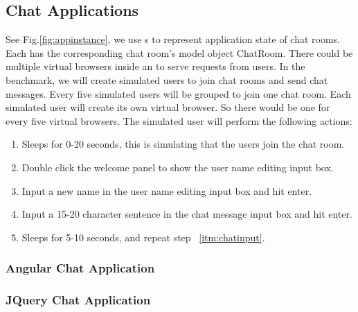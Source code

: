 \clickthroughput{}
\clicklatency{}

\clickwaitthroughput{}
\clickwaitlatency{}

\subsection{Chat Applications}
See Fig.\ref{fig:appinstance},
we use \appins{}s to represent application state of chat rooms.
Each \appins{} has the corresponding chat room's model object ChatRoom.
There could be multiple virtual browsers inside an \appins{} to  
serve requests from users.
In the benchmark, 
we will create simulated users to join chat rooms and send chat messages.
Every five simulated users will be grouped to join one chat room.
Each simulated user will create its own virtual browser.
So there would be one \appins{} for every five virtual browsers.
The simulated user will perform the following actions:
\begin{enumerate}
\item Sleeps for 0-20 seconds, this is simulating that the users
join the chat room.

\item Double click the welcome panel to show the user name editing input box.

\item Input a new name in the user name editing input box and hit enter.

\item \label{itm:chatinput} Input a 15-20 character sentence in the chat message input box and hit enter.

\item Sleeps for 5-10 seconds, and repeat step ~\ref{itm:chatinput}.

\end{enumerate}


\appinstancefig{}



\subsubsection{Angular Chat Application}
\label{sec:angular}

\angularchatlatency{}

\subsubsection{JQuery Chat Application}
\label{sec:jquery}

\jquerychatlatency{}